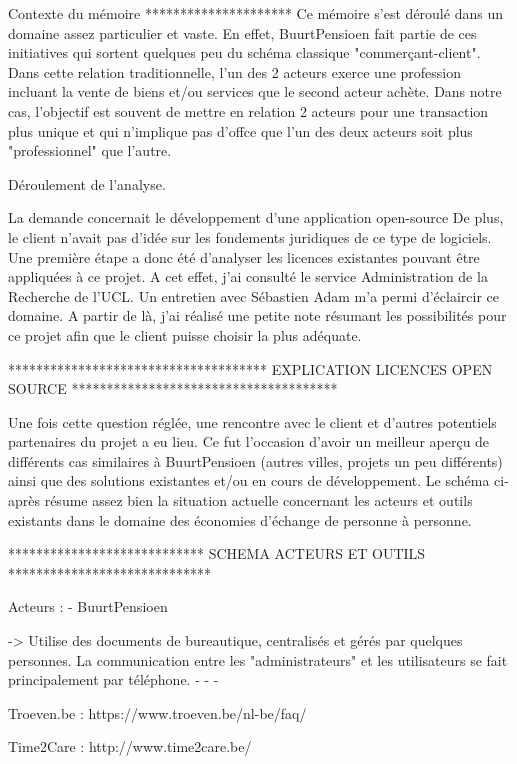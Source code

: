 Contexte du mémoire
*********************
Ce mémoire s'est déroulé dans un domaine assez particulier et vaste.  En effet,  BuurtPensioen fait partie de ces initiatives qui sortent quelques peu du schéma classique "commerçant-client".  Dans cette relation traditionnelle,   l'un des 2 acteurs exerce une profession incluant la vente de biens et/ou services que le second acteur achète.  Dans notre cas,  l'objectif est souvent de mettre en relation 2 acteurs pour une transaction plus unique et qui n'implique pas d'offce que l'un des deux acteurs soit plus "professionnel" que l'autre.  




Déroulement de l'analyse.

La demande concernait le développement d'une application open-source De plus, le client n'avait pas d'idée sur les fondements juridiques de ce type de logiciels.  Une première étape a donc été d'analyser les licences existantes pouvant être appliquées à ce projet.  A cet effet,  j'ai consulté le service Administration de la Recherche de l'UCL.  Un entretien avec Sébastien Adam m'a permi d'éclaircir ce domaine.  A partir de là,  j'ai réalisé une petite note résumant les possibilités pour ce projet afin que le client puisse choisir la plus adéquate.  

*************************************
EXPLICATION LICENCES OPEN SOURCE
**************************************

Une fois cette question réglée,  une rencontre avec le client et d'autres potentiels partenaires du projet a eu lieu.  Ce fut l'occasion d'avoir un meilleur aperçu de différents cas similaires à BuurtPensioen (autres villes,  projets un peu différents) ainsi que des solutions existantes et/ou en cours de développement.  Le schéma ci-après résume assez bien la situation actuelle concernant les acteurs et outils existants dans le domaine des économies d'échange de personne à personne.  

****************************
SCHEMA ACTEURS ET OUTILS
*****************************

Acteurs : 
- BuurtPensioen

-> Utilise des documents de bureautique,  centralisés et gérés par quelques personnes.  La communication entre les "administrateurs" et les utilisateurs se fait principalement par téléphone.
- 
- 
- 

Troeven.be : 
https://www.troeven.be/nl-be/faq/

Time2Care : 
http://www.time2care.be/
